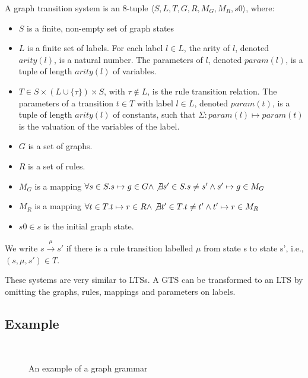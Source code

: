 \begin{definition}
A graph transition system is an 8-tuple	$\langle S, L, T, G, R, M_G, M_R, s0\rangle$, where:
\begin{itemize}
\item $S$ is a finite, non-empty set of graph states
\item $L$ is a finite set of labels. For each label $l\in L$, the arity of $l$, denoted $\mathit{arity(l)}$, is a natural number. The parameters of $l$, denoted $\mathit{param(l)}$, is a tuple of length $\mathit{arity(l)}$ of variables.
\item $T \in S \times (L \cup \{\tau\}) \times S$, with $\tau \notin L$, is the rule transition relation. The parameters of a transition $t \in T$ with label $l \in L$, denoted $\mathit{param(t)}$, is a tuple of length $\mathit{arity(l)}$ of constants, such that $\Sigma:\mathit{param(l)} \mapsto \mathit{param(t)}$ is the valuation of the variables of the label.
\item $G$ is a set of graphs.
\item $R$ is a set of rules.
\item $M_G$ is a mapping $\forall s \in S . s \mapsto g \in G \land \not\exists s' \in S . s \neq s' \land s' \mapsto g \in M_G$
\item $M_R$ is a mapping $\forall t \in T . t \mapsto r \in R \land \not\exists t' \in T . t \neq t' \land t' \mapsto r \in M_R$
\item $s0 \in s$ is the initial graph state.
\end{itemize}
We write $s \xrightarrow{\mu}s'$ if there is a rule transition labelled $\mu$ from state s to state s', i.e., $(s, \mu, s') \in T$.
\end{definition}

These systems are very similar to LTSs. A GTS can be transformed to an LTS by omitting the graphs, rules, mappings and parameters on labels.

\subsection{Example}\label{sec:gts_example}

\begin{figure}[h]
  \begin{center}
    \\
  \end{center}
  \caption{An example of a graph grammar}
  \label{fig:trafo_basic_sts}
\end{figure}

